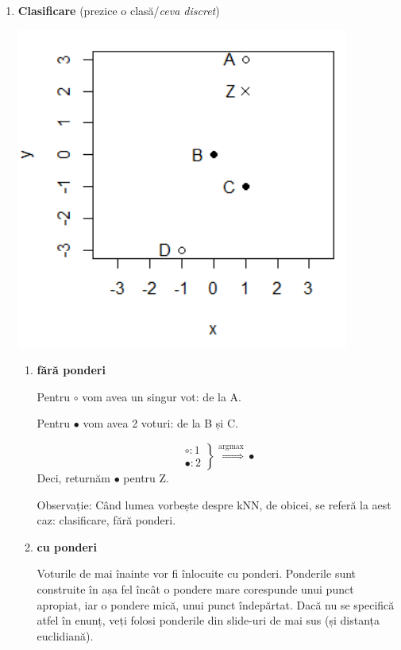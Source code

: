 \documentclass[12pt]{article}
\begin{document}
	\begin{enumerate}
		\item \textbf{Clasificare} (prezice o clasă/\textit{ceva discret})
		\begin{center}
			\includegraphics{screenshot006}
		\end{center}
		\begin{enumerate}
			\item \textbf{fără ponderi}
			
			Pentru $\circ$ vom avea un singur vot: de la A.
			
			Pentru $\bullet$ vom avea 2 voturi: de la B și C.
			
			$$
			\left.
			\begin{array}{ll}
			\circ: 1 \\
			\bullet: 2
			\end{array}
			\right \} \stackrel{\text{argmax}}{\Rightarrow} \bullet
			$$
			Deci, returnăm $\bullet$ pentru Z.
			
			Observație: Când lumea vorbește despre kNN, de obicei, se referă la aest caz: clasificare, fără ponderi.
			
			\item \textbf{cu ponderi}
			
			Voturile de mai înainte vor fi înlocuite cu ponderi. Ponderile sunt construite în așa fel încât o pondere mare corespunde unui punct apropiat, iar o pondere mică, unui punct îndepărtat. Dacă nu se specifică atfel în enunț, veți folosi ponderile din slide-uri de mai sus (și distanța euclidiană).
			

\end{enumerate}
\end{enumerate}
\end{document}
